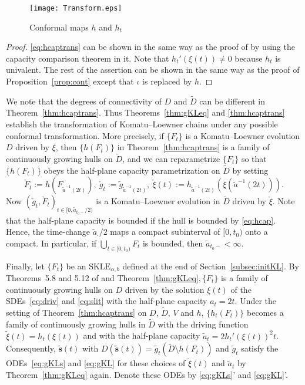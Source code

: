 \documentclass[preprint,12pt]{elsarticle}
\theoremstyle{definition}
\newcommand{\skle}{\mathrm{SKLE}}
\newcommand{\slit}{\mathbf{s}}
\begin{document}
\begin{figure}
\centering
\texttt{[image: Transform.eps]}
\caption{Conformal maps $h$ and $h_t$}
\end{figure}

\begin{proof}
\eqref{eq:hcaptrans} can be shown in the same way as the proof of
\cite[Theorem~6.8]{CF18} by using the capacity comparison theorem in it.
Note that $h_t'(\xi(t)) \neq 0$ because $h_t$ is univalent.
The rest of the assertion can be shown in the same way as the proof of
Proposition~\ref{prop:cont} except that $\iota$ is replaced by $h$.
\end{proof}

We note that the degrees of connectivity of $D$ and $\tilde{D}$ can be different
in Theorem~\ref{thm:hcaptrans}.
Thus Theorems~\ref{thm:gKLeq} and \ref{thm:hcaptrans} establish
the transformation of Komatu--Loewner chains
under any possible conformal transformation.
More precisely, if $\{F_t\}$ is a Komatu--Loewner evolution $D$ driven by $\xi$,
then $\{h(F_t)\}$ in Theorem~\ref{thm:hcaptrans} is a family
of continuously growing hulls on $\tilde{D}$, and
we can reparametrize $\{F_t\}$ so that $\{h(F_t)\}$ obeys the
half-plane capacity parametrization on $\tilde{D}$ by setting
\begin{equation} \label{eq:hcaprep}
\check{F}_t:=h(F_{\tilde{a}^{-1}(2t)}),\ \check{g}_t:=\tilde{g}_{\tilde{a}^{-1}(2t)},\
\check{\xi}(t):=h_{\tilde{a}^{-1}(2t)}(\xi(\tilde{a}^{-1}(2t))).
\end{equation}
Now $(\check{g}_t, \check{F}_t)_{t \in [0, \tilde{a}_{t_0-}/2)}$ is
a Komatu--Loewner evolution in $\tilde{D}$ driven by $\check{\xi}$.
Note that the half-plane capacity is bounded if the hull is bounded
by \eqref{eq:hcap}.
Hence, the time-change $\tilde{a}_{\cdot}/2$ maps a compact subinterval
of $[0, t_0)$ onto a compact.
In particular, if $\bigcup_{t \in [0, t_0)} F_t$ is bounded,
then $\tilde{a}_{t_0-}<\infty$.

Finally, let $\{F_t\}$ be an $\skle_{\alpha, b}$ defined
at the end of Section~\ref{subsec:initKL}.
By Theorems~5.8 and 5.12 of \cite{CF18} and Theorem~\ref{thm:gKLeq}$,
\{F_t\}$ is a family of continuously growing hulls on $D$
driven by the solution $\xi(t)$ of the SDEs~\eqref{eq:driv} and \eqref{eq:slit}
with the half-plane capacity $a_t=2t$.
Under the setting of Theorem~\ref{thm:hcaptrans} on $D$, $\tilde{D}$, $V$ and $h$,
$\{h_t(F_t)\}$ becomes a family of continuously growing hulls in $\tilde{D}$
with the driving function $\tilde{\xi}(t)=h_t(\xi(t))$ and
with the half-plane capacity $\tilde{a}_t=2h_t'(\xi(t))^2t$.
Consequently, $\tilde{\slit}(t)$
with $D(\tilde{\slit}(t))=\tilde{g}_t(\tilde{D} \setminus h(F_t))$
and $\tilde{g}_t$ satisfy the ODEs~\eqref{eq:gKLs} and \eqref{eq:gKL}
for these choices of $\tilde{\xi}(t)$ and $\tilde{a}_t$ by Theorem~\ref{thm:gKLeq}
again. Denote these ODEs by \eqref{eq:gKLs}' and \eqref{eq:gKL}'.
\end{document}
